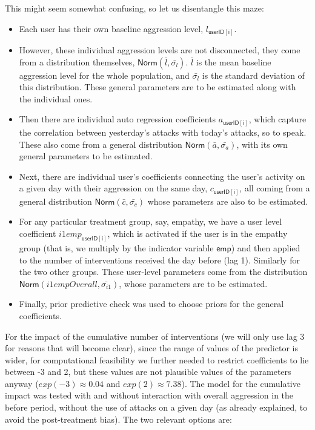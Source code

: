 \documentclass[preprint,12pt]{elsarticle}
\begin{document}
\normalsize



\noindent This might seem somewhat confusing, so let us disentangle this maze:

\begin{itemize}
\item Each user has their own baseline aggression level, $l_{\mathsf{userID[i]}}$. \item However, these individual aggression levels are not disconnected, they come from a distribution themselves, $\textsf{Norm}(\bar{l}, \bar{\sigma_l})$. $\bar{l}$ is the mean baseline aggression level for the whole population, and $\bar{\sigma_l}$ is the standard deviation of this distribution. These general parameters are to be estimated along with the individual ones.
\item Then  there are individual auto regression coefficients     $a_{\mathsf{userID[i]}}$, which capture the correlation between  yesterday's attacks with today's attacks, so to speak. These also come from a general distribution \linebreak  $\textsf{Norm}(\bar{a}, \bar{\sigma_a})$, with its own general parameters to be estimated.
\item Next, there are individual user's coefficients connecting the user's activity on a given day with their aggression on the same day,  $c_{\mathsf{userID[i]}}$, all coming from a general distribution $\textsf{Norm}(\bar{c}, \bar{\sigma_c})$ whose parameters are also to be estimated.
\item For any particular treatment group, say, empathy, we have a user level coefficient $i1emp_{\mathsf{userID[i]}}$, which is activated if the user is in the empathy group (that is, we multiply by the indicator variable $\mathsf{emp}$) and then applied to the number of interventions received the day before (lag 1). Similarly for the two other groups. These user-level parameters come from the distribution $\textsf{Norm}(i1empOverall, \bar{\sigma_{i1}})$, whose parameters are to be estimated.
\item Finally, prior predictive check was used to choose priors for the general coefficients. 
\end{itemize}




For the impact of the cumulative number of interventions (we will only
use lag 3 for reasons that will become clear), since the range of values
of the predictor is wider, for computational feasibility we further
needed to restrict coefficients to lie between -3 and 2, but these
values are not plausible values of the parameters anyway
(\(exp(-3) \approx 0.04\) and \(exp(2) \approx 7.38\)). The model for
the cumulative impact was tested with and without interaction with
overall aggression in the before period, without the use of attacks on a
given day (as already explained, to avoid the post-treatment bias). The
two relevant options   are:
\end{document}
